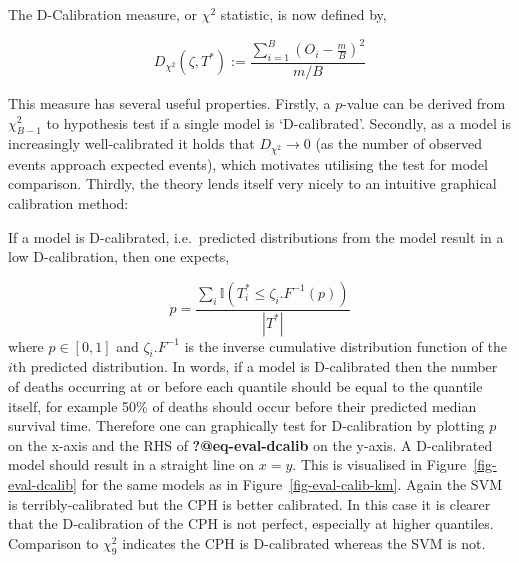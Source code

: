 \documentclass[
  letterpaper,
]{scrbook}
\theoremstyle{plain}
\theoremstyle{definition}
\theoremstyle{remark}
\begin{document}
The D-Calibration measure, or \(\chi^2\) statistic, is now defined by,

\[
D_{\chi^2}(\zeta, T^*) :=  \frac{\sum^B_{i = 1} (O_i - \frac{m}{B})^2}{m/B}
\]

This measure has several useful properties. Firstly, a \(p\)-value can
be derived from \(\chi^2_{B-1}\) to hypothesis test if a single model is
`D-calibrated'. Secondly, as a model is increasingly well-calibrated it
holds that \(D_{\chi^2} \rightarrow 0\) (as the number of observed
events approach expected events), which motivates utilising the test for
model comparison. Thirdly, the theory lends itself very nicely to an
intuitive graphical calibration method:

If a model is D-calibrated, i.e.~predicted distributions from the model
result in a low D-calibration, then one expects,

\[
\label{eq:eval_dcalib}
p = \frac{\sum_i \mathbb{I}(T^*_i \leq \zeta_i.F^{-1}(p))}{|T^*|}
\] where \(p \in [0,1]\) and \(\zeta_i.F^{-1}\) is the inverse
cumulative distribution function of the \(i\)th predicted distribution.
In words, if a model is D-calibrated then the number of deaths occurring
at or before each quantile should be equal to the quantile itself, for
example 50\% of deaths should occur before their predicted median
survival time. Therefore one can graphically test for D-calibration by
plotting \(p\) on the x-axis and the RHS of \textbf{?@eq-eval-dcalib} on
the y-axis. A D-calibrated model should result in a straight line on
\(x = y\). This is visualised in Figure~\ref{fig-eval-dcalib} for the
same models as in Figure~\ref{fig-eval-calib-km}. Again the SVM is
terribly-calibrated but the CPH is better calibrated. In this case it is
clearer that the D-calibration of the CPH is not perfect, especially at
higher quantiles. Comparison to \(\chi^2_9\) indicates the CPH is
D-calibrated whereas the SVM is not.
\end{document}
